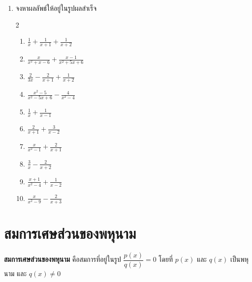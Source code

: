 \begin{enumerate}[label=\arabic*., leftmargin=*, itemsep=0.6em]
\begin{multicols}{2}
\begin{enumerate}[label=\theenumi\arabic*), leftmargin=2em, itemsep=0.6em]
\item $\left(\frac{x^2 + 7x + 12}{x + 3}\right)
\div
\left(\frac{x + 4}{x + 3}\right)$

\item $\left(\frac{3x - 12}{x^2}\right)
\div
\left(\frac{x^2 - 16}{x^3}\right)$

\item $\left(\frac{x^2 - 25}{x^2 - x - 20}\right)
\cdot
\left(\frac{x - 5}{x + 5}\right)$

\item $\left(\frac{x^2 + 2x - 15}{x - 3}\right)
\div
\left(\frac{x + 5}{x - 3}\right)$
	\end{enumerate}
\end{multicols}
	\item จงหาผลลัพธ์ให้อยู่ในรูปผลสำเร็จ
		\begin{multicols}{2}
	\begin{enumerate}[label=\theenumi\arabic*), leftmargin=2em, itemsep=0.6em]
		\everymath{\displaystyle}
		\item $\frac{1}{x} + \frac{1}{x + 1} + \frac{1}{x + 2}$
		\item $\frac{x}{x^2 + x - 6} + \frac{x - 1}{x^2 + 5x + 6}$
		\item $\frac{2}{3x} - \frac{2}{x + 1} + \frac{1}{x + 2}$
		\item $\frac{x^2 - 5}{x^2 - 5x + 6} - \frac{4}{x^2 - 4}$
		\item $\frac{1}{x}+\frac{1}{x-1}$
		
		\item $\frac{2}{x+1}+\frac{3}{x-2}$
		
		\item $\frac{x}{x^2-1}+\frac{2}{x+1}$
		
		\item $\frac{3}{x}-\frac{2}{x+2}$
		
		\item $\frac{x+1}{x^2-4}+\frac{1}{x-2}$
		
		\item $\frac{x}{x^2-9}-\frac{2}{x+3}$
	\end{enumerate}
\end{multicols}
\end{enumerate}


\newpage
\section{สมการเศษส่วนของพหุนาม}

\textbf{สมการเศษส่วนของพหุนาม} คือสมการที่อยู่ในรูป $\dfrac{p(x)}{q(x)} = 0$ โดยที่ $p(x)$ และ $q(x)$ เป็นพหุนาม และ $q(x) \neq 0$ 

